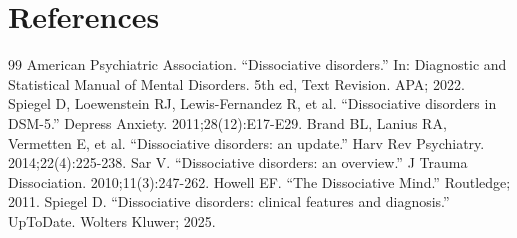 \section*{References}
\begin{thebibliography}{99}
 American Psychiatric Association. ``Dissociative disorders.'' In: Diagnostic and Statistical Manual of Mental Disorders. 5th ed, Text Revision. APA; 2022.
 Spiegel D, Loewenstein RJ, Lewis-Fernandez R, et al. ``Dissociative disorders in DSM-5.'' Depress Anxiety. 2011;28(12):E17-E29.
 Brand BL, Lanius RA, Vermetten E, et al. ``Dissociative disorders: an update.'' Harv Rev Psychiatry. 2014;22(4):225-238.
 Sar V. ``Dissociative disorders: an overview.'' J Trauma Dissociation. 2010;11(3):247-262.
 Howell EF. ``The Dissociative Mind.'' Routledge; 2011.
 Spiegel D. ``Dissociative disorders: clinical features and diagnosis.'' UpToDate. Wolters Kluwer; 2025.
\end{thebibliography}

